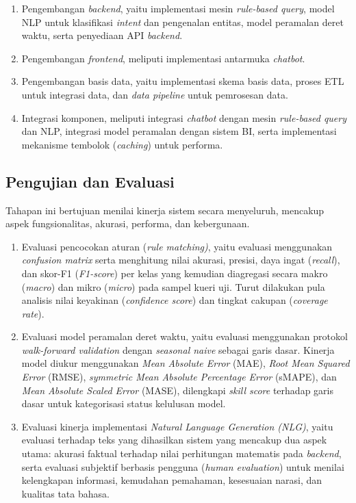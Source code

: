 \begin{enumerate}[label=\alph*.]
  \item Pengembangan \textit{backend}, yaitu implementasi mesin \textit{rule-based query}, model NLP untuk klasifikasi \textit{intent} dan pengenalan entitas, model peramalan deret waktu, serta penyediaan API\label{abbr:API} \textit{backend}.
  
  \item Pengembangan \textit{frontend}, meliputi implementasi antarmuka \textit{chatbot}.
  
  \item Pengembangan basis data, yaitu implementasi skema basis data, proses ETL untuk integrasi data, dan \textit{data pipeline} untuk pemrosesan data.
  
  \item Integrasi komponen, meliputi integrasi \textit{chatbot} dengan mesin \textit{rule-based query} dan NLP, integrasi model peramalan dengan sistem BI, serta implementasi mekanisme tembolok (\textit{caching}) untuk performa.
\end{enumerate}

\subsection{Pengujian dan Evaluasi}

Tahapan ini bertujuan menilai kinerja sistem secara menyeluruh, mencakup aspek fungsionalitas, akurasi, performa, dan kebergunaan.

\begin{enumerate}[label=\alph*.]
  \item Evaluasi pencocokan aturan (\textit{rule matching)}, yaitu evaluasi menggunakan \textit{confusion matrix} serta menghitung nilai akurasi, presisi, daya ingat (\textit{recall}), dan skor-F1 (\textit{F1-score}) per kelas yang kemudian diagregasi secara makro (\textit{macro}) dan mikro (\textit{micro}) pada sampel kueri uji. Turut dilakukan pula analisis nilai keyakinan (\textit{confidence score}) dan tingkat cakupan (\textit{coverage rate}).
  \item Evaluasi model peramalan deret waktu, yaitu evaluasi menggunakan protokol \textit{walk-\-forward va\-li\-da\-tion} dengan \textit{seasonal naive} sebagai garis dasar. Kinerja model diukur menggunakan \textit{Mean Absolute Error} (MAE)\label{abbr:MAE}, \textit{Root Mean Squared Error} (RMSE)\label{abbr:RMSE}, \textit{symmetric Mean Absolute Percentage Error} (sMAPE)\label{abbr:sMAPE}, dan \textit{Mean Absolute Scaled Error} (MASE)\label{abbr:MASE}, dilengkapi \textit{skill score} terhadap garis dasar untuk kategorisasi status kelulusan model.
  \item Evaluasi kinerja implementasi \textit{Natural Language Generation (NLG)}, yaitu evaluasi terhadap teks yang dihasilkan sistem yang mencakup dua aspek utama: akurasi faktual terhadap nilai perhitungan matematis pada \textit{backend}, serta evaluasi subjektif berbasis pengguna (\textit{human evaluation}) untuk menilai kelengkapan informasi, kemudahan pemahaman, kesesuaian narasi, dan kualitas tata bahasa.
\end{enumerate}

